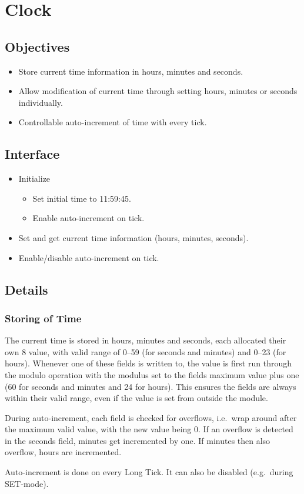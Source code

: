 \chapter{Clock}

\section{Objectives}

\begin{itemize}
    \item Store current time information in hours, minutes and seconds.
    \item Allow modification of current time through setting hours, minutes or seconds individually.
    \item Controllable auto-increment of time with every tick.
\end{itemize}

\section{Interface}

\begin{itemize}
    \item Initialize
          \begin{itemize}
              \item Set initial time to 11:59:45.
              \item Enable auto-increment on tick.
          \end{itemize}
    \item Set and get current time information (hours, minutes, seconds).
    \item Enable/disable auto-increment on tick.
\end{itemize}

\section{Details}

\subsection{Storing of Time}

The current time is stored in hours, minutes and seconds, each allocated their own \SI{8}{\bit} value, with valid range of \numrange{0}{59} (for seconds and minutes) and \numrange{0}{23} (for hours). Whenever one of these fields is written to, the value is first run through the modulo operation with the modulus set to the fields maximum value plus one (\num{60} for seconds and minutes and \num{24} for hours). This ensures the fields are always within their valid range, even if the value is set from outside the module.

During auto-increment, each field is checked for overflows, i.e.\ wrap around after the maximum valid value, with the new value being \num{0}. If an overflow is detected in the seconds field, minutes get incremented by one. If minutes then also overflow, hours are incremented.

Auto-increment is done on every Long Tick. It can also be disabled (e.g.\ during SET-mode).
